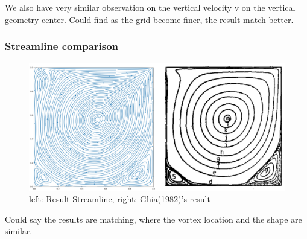 \documentclass[12pt]{article}
\begin{document}
We also have very similar observation on the vertical velocity v on the vertical geometry center. Could find as the grid become finer, the result match better.


\subsubsection{Streamline comparison}
\begin{figure}[H]
    \centering
    \includegraphics[width=0.9\linewidth]{figures/Re=1000_result/Re=1000_Compare.jpg}
    \caption{left: Result Streamline, right: Ghia(1982)\cite{GHIA1982387}'s result}
\end{figure}

Could say the results are matching, where the vortex location and the shape are similar.
















\end{document}
